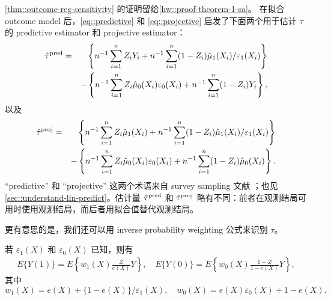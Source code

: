  


\cref{thm::outcome-reg-sensitivity} 的证明留给\cref{hw::proof-theorem-1-sa}。
在拟合 outcome model 后，\cref{eq::predictive} 和 \cref{eq::projective} 启发了下面两个用于估计 $\tau$ 的 predictive estimator 和 projective estimator：
\begin{eqnarray*}
\hat\tau^{\textup{pred}} &=&\left\{  n^{-1}\sum_{i=1}^n Z_i Y_i + n^{-1} \sum_{i=1}^n (1-Z_i) \hat{\mu}_1(X_i)   / \varepsilon_1(X_i)  \right\} \\
&&- \left\{ n^{-1}  \sum_{i=1}^n Z_i \hat{\mu}_0(X_i)    \varepsilon_0(X_i) + n^{-1} \sum_{i=1}^n (1-Z_i) Y_i \right\},
\end{eqnarray*}
以及
\begin{eqnarray*}
\hat{\tau}^{\textup{proj}}&=&\left\{ n^{-1}\sum_{i=1}^n Z_{i}\hat{\mu}_{1}(X_{i})+n^{-1}\sum_{i=1}^n(1-Z_{i})\hat{\mu}_{1}(X_{i})/\varepsilon_{1}(X_{i})\right\} \\
&&-\left\{ n^{-1}\sum_{i=1}^n Z_{i}\hat{\mu}_{0}(X_{i})\varepsilon_{0}(X_{i})+n^{-1}\sum_{i=1}^n(1-Z_{i})\hat{\mu}_{0}(X_{i})\right\}.
\end{eqnarray*} 
``predictive'' 和 ``projective'' 这两个术语来自 survey sampling 文献 \citep{firth1998robust, ding2018causal}；也见\cref{sec::understand-lin-predict}。估计量 $\hat\tau^{\textup{pred}} $ 和 $\hat{\tau}^{\textup{proj}}$ 略有不同：前者在观测结局可用时使用观测结局，而后者用拟合值替代观测结局。





更有意思的是，我们还可以用 inverse probability weighting 公式来识别 $\tau$。

\begin{theorem}\label{thm::ipw-sensitivity}
若 $\varepsilon_1(X)$ 和 $ \varepsilon_0(X) $ 已知，则有
\begin{eqnarray*} 
E\{ Y(1) \} = 
E\left\{ w_1(X) \frac{Z}{e(X)}  Y  \right\}  ,\quad
 E\{Y(0)\} = E\left\{ w_0(X) \frac{1-Z}{1-e(X)} Y \right\},
\end{eqnarray*}
其中
$$
w_1(X) = e(X) + \{1-e(X)\}/ \varepsilon_1(X) ,\quad
w_0(X) = e(X)  \varepsilon_0(X) + 1- e(X). 
$$
\end{theorem}


 
 

